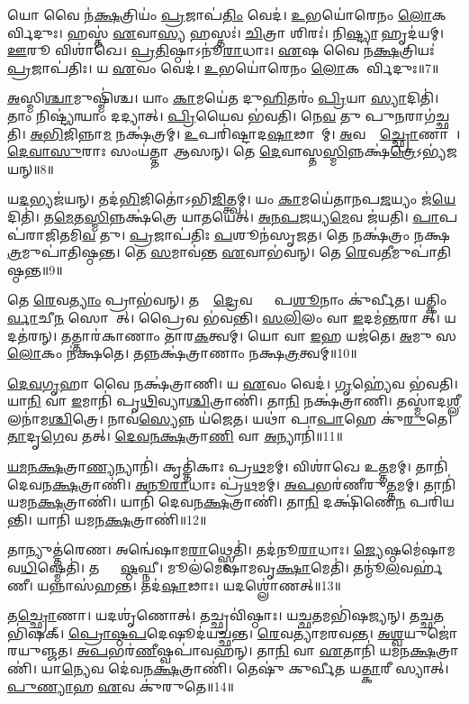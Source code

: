 𑌯𑍋 𑌵𑍈 𑌨॑\ul{𑌕𑍍𑌷}𑌤𑍍𑌰𑌿𑌯𑌂॑ \ul{𑌪𑍍𑌰}𑌜𑌾𑌪॑\ul{𑌤𑌿𑌂} 𑌵𑍇𑌦॑।
\ul{𑌉}𑌭𑌯𑍋॑𑌰𑍇𑌨𑌂 \ul{𑌲𑍋}𑌕𑌯𑍋᳚𑌰𑍍𑌵𑌿𑌦𑍁𑌃।
𑌹𑌸𑍍𑌤॑ \ul{𑌏}𑌵𑌾\ul{𑌸𑍍𑌯} 𑌹𑌸𑍍𑌤𑌃॑।
\ul{𑌚𑌿}𑌤𑍍𑌰𑌾 𑌶𑌿𑌰𑌃॑।
𑌨𑌿\ul{𑌷𑍍𑌟𑍍𑌯𑌾} 𑌹𑍃𑌦॑𑌯𑌮𑍍।
\ul{𑌊}𑌰𑍂 𑌵𑌿𑌶𑌾॑𑌖𑍇।
\ul{𑌪𑍍𑌰}\ul{𑌤𑌿}𑌷𑍍𑌠𑌾\-𑌽𑌨𑍂॑\ul{𑌰𑌾}𑌧𑌾𑌃।
\ul{𑌏}𑌷 𑌵𑍈 𑌨॑\ul{𑌕𑍍𑌷}𑌤𑍍𑌰𑌿𑌯𑌃॑ \ul{𑌪𑍍𑌰}𑌜𑌾𑌪॑𑌤𑌿𑌃।
𑌯 \ul{𑌏}𑌵𑌂 𑌵𑍇𑌦॑।
\ul{𑌉}𑌭𑌯𑍋॑𑌰𑍇𑌨𑌂 \ul{𑌲𑍋}𑌕𑌯𑍋᳚𑌰𑍍𑌵𑌿𑌦𑍁𑌃॥7॥

\ul{𑌅}𑌸𑍍𑌮𑌿\ul{𑌶𑍍𑌚𑌾}𑌮𑍁𑌷𑍍𑌮𑌿॑𑌶𑍍𑌚।
𑌯𑌾𑌂 \ul{𑌕𑌾}𑌮𑌯𑍇॑𑌤 𑌦𑍁\ul{𑌹𑌿}𑌤𑌰𑌂॑ \ul{𑌪𑍍𑌰𑌿}𑌯𑌾 \ul{𑌸𑍍𑌯𑌾}𑌦𑌿𑌤𑌿॑।
𑌤𑌾𑌂 𑌨𑌿𑌷𑍍𑌟𑍍𑌯𑌾॑𑌯𑌾𑌂 𑌦𑌦𑍍𑌯𑌾𑌤𑍍।
\ul{𑌪𑍍𑌰𑌿}𑌯𑍈𑌵 𑌭॑𑌵𑌤𑌿।
𑌨𑍇\ul{𑌵} 𑌤𑍁 𑌪𑍁\ul{𑌨}𑌰𑌾𑌗॑𑌚𑍍𑌛𑌤𑌿।
\ul{𑌅}\ul{𑌭𑌿}𑌜𑌿𑌨𑍍𑌨𑌾\ul{𑌮} 𑌨𑌕𑍍𑌷॑𑌤𑍍𑌰𑌮𑍍।
\ul{𑌉}𑌪𑌰𑌿॑𑌷𑍍𑌟𑌾𑌦\ul{𑌷𑌾}𑌢𑌾𑌨𑌾᳚𑌮𑍍।
\ul{𑌅}𑌵𑌸𑍍𑌤𑌾᳚\ul{𑌚𑍍𑌛𑍍𑌰𑍋}𑌣𑌾𑌯𑍈᳚।
\ul{𑌦𑍇}\ul{𑌵𑌾}\ul{𑌸𑍁}𑌰𑌾𑌃 𑌸𑌂𑌯॑𑌤𑍍𑌤𑌾 𑌆𑌸𑌨𑍍।
𑌤𑍇 \ul{𑌦𑍇}𑌵𑌾𑌸𑍍𑌤\ul{𑌸𑍍𑌮𑌿}𑌨𑍍𑌨𑌕𑍍𑌷॑\ul{𑌤𑍍𑌰𑍇}\-𑌽𑌭𑍍𑌯॑𑌜𑌯𑌨𑍍॥8॥

𑌯\ul{𑌦}𑌭𑍍𑌯𑌜॑𑌯𑌨𑍍।
𑌤𑌦॑\ul{𑌭𑌿}𑌜𑌿𑌤𑍋॑\-𑌽𑌭𑌿\ul{𑌜𑌿}𑌤𑍍𑌤𑍍𑌵𑌮𑍍।
𑌯𑌂 \ul{𑌕𑌾}𑌮𑌯𑍇॑𑌤𑌾𑌨𑌪\-\ul{𑌜}𑌯𑍍𑌯𑌂 𑌜॑\ul{𑌯𑍇}𑌦𑌿𑌤𑌿॑।
𑌤\ul{𑌮𑍇}𑌤\ul{𑌸𑍍𑌮𑌿}𑌨𑍍𑌨𑌕𑍍𑌷॑𑌤𑍍𑌰𑍇 𑌯𑌾𑌤𑌯𑍇𑌤𑍍।
\ul{𑌅}\ul{𑌨}\ul{𑌪}\ul{𑌜}𑌯𑍍𑌯\ul{𑌮𑍇}𑌵 𑌜॑𑌯𑌤𑌿।
\ul{𑌪𑌾}𑌪𑌪॑𑌰𑌾𑌜𑌿𑌤𑌮𑌿\ul{𑌵} 𑌤𑍁।
\ul{𑌪𑍍𑌰}𑌜𑌾𑌪॑𑌤𑌿𑌃 \ul{𑌪}𑌶𑍂𑌨॑𑌸𑍃𑌜𑌤।
𑌤𑍇 𑌨𑌕𑍍𑌷॑𑌤𑍍𑌰𑌂 𑌨𑌕𑍍𑌷\ul{𑌤𑍍𑌰}𑌮𑍁𑌪𑌾॑𑌤𑌿𑌷𑍍𑌠𑌨𑍍𑌤।
𑌤𑍇 \ul{𑌸}𑌮𑌾𑌵॑𑌨𑍍𑌤 \ul{𑌏}𑌵𑌾𑌭॑𑌵𑌨𑍍।
𑌤𑍇 \ul{𑌰𑍇}𑌵\ul{𑌤𑍀}𑌮𑍁𑌪𑌾॑𑌤𑌿𑌷𑍍𑌠𑌨𑍍𑌤॥9॥

𑌤𑍇 \ul{𑌰𑍇}𑌵\ul{𑌤𑍍𑌯𑌾𑌂} 𑌪𑍍𑌰𑌾𑌭॑𑌵𑌨𑍍।
𑌤𑌸𑍍𑌮𑌾᳚\ul{𑌦𑍍𑌰𑍇}𑌵𑌤𑍍𑌯𑌾𑌂᳚ 𑌪\ul{𑌶𑍂}𑌨𑌾𑌂 𑌕𑍁॑𑌰𑍍𑌵𑍀𑌤।
𑌯𑌤𑍍𑌕𑌿𑌂 𑌚𑌾᳚\ul{𑌰𑍍𑌵𑌾}𑌚𑍀\ul{𑌨}\ul{} 𑌸𑍋𑌮𑌾᳚𑌤𑍍।
𑌪𑍍𑌰𑍈𑌵 𑌭॑𑌵𑌨𑍍𑌤𑌿।
\ul{𑌸}\ul{𑌲𑌿}𑌲𑌂 𑌵𑌾 \ul{𑌇}𑌦𑌮॑\ul{𑌨𑍍𑌤}𑌰𑌾𑌸𑍀᳚𑌤𑍍।
𑌯𑌦𑌤॑𑌰𑌨𑍍।
𑌤𑌤𑍍𑌤𑌾𑌰॑𑌕𑌾𑌣𑌾𑌂 𑌤𑌾𑌰\ul{𑌕}𑌤𑍍𑌵𑌮𑍍।
𑌯𑍋 𑌵𑌾 \ul{𑌇}𑌹 𑌯𑌜॑𑌤𑍇।
\ul{𑌅}𑌮𑍁 𑌸 \ul{𑌲𑍋}𑌕𑌂 𑌨॑𑌕𑍍𑌷𑌤𑍇।
𑌤𑌨𑍍𑌨𑌕𑍍𑌷॑𑌤𑍍𑌰𑌾𑌣𑌾𑌂 𑌨𑌕𑍍𑌷\ul{𑌤𑍍𑌰}𑌤𑍍𑌵𑌮𑍍॥10॥

\ul{𑌦𑍇}\ul{𑌵}\ul{𑌗𑍃}𑌹𑌾 𑌵𑍈 𑌨𑌕𑍍𑌷॑𑌤𑍍𑌰𑌾𑌣𑌿।
𑌯 \ul{𑌏}𑌵𑌂 𑌵𑍇𑌦॑।
\ul{𑌗𑍃}𑌹𑍍𑌯𑍇॑𑌵 𑌭॑𑌵𑌤𑌿।
𑌯𑌾\ul{𑌨𑌿} 𑌵𑌾 \ul{𑌇}𑌮𑌾𑌨𑌿॑ 𑌪𑍃\ul{𑌥𑌿}𑌵𑍍𑌯𑌾\ul{𑌶𑍍𑌚𑌿}𑌤𑍍𑌰𑌾𑌣𑌿॑।
𑌤𑌾\ul{𑌨𑌿} 𑌨𑌕𑍍𑌷॑𑌤𑍍𑌰𑌾𑌣𑌿।
𑌤𑌸𑍍𑌮𑌾॑𑌦\ul{𑌶𑍍𑌲𑍀}𑌲𑌨𑌾॑𑌮\ul{𑌶𑍍𑌚𑌿}𑌤𑍍𑌰𑍇।
𑌨𑌾𑌵॑\ul{𑌸𑍍𑌯𑍇}𑌨𑍍𑌨 𑌯॑𑌜𑍇𑌤।
𑌯𑌥𑌾॑ 𑌪𑌾\ul{𑌪𑌾}𑌹𑍇 𑌕𑍁॑\ul{𑌰𑍁}𑌤𑍇।
\ul{𑌤𑌾}𑌦𑍃\ul{𑌗𑍇}𑌵 𑌤𑌤𑍍।
\ul{𑌦𑍇}\ul{𑌵}\ul{𑌨}\ul{𑌕𑍍𑌷}𑌤𑍍𑌰𑌾\ul{𑌣𑌿} 𑌵𑌾 \ul{𑌅}𑌨𑍍𑌯𑌾𑌨𑌿॑॥11॥

\ul{𑌯}\ul{𑌮}\ul{𑌨}\ul{𑌕𑍍𑌷}𑌤𑍍𑌰𑌾\ul{𑌣𑍍𑌯}𑌨𑍍𑌯𑌾𑌨𑌿॑।
𑌕𑍃𑌤𑍍𑌤𑌿॑𑌕𑌾𑌃 𑌪𑍍𑌰\ul{𑌥}𑌮𑌮𑍍।
𑌵𑌿𑌶𑌾॑𑌖𑍇 𑌉\ul{𑌤𑍍𑌤}𑌮𑌮𑍍।
𑌤𑌾𑌨𑌿॑ 𑌦𑍇𑌵𑌨\ul{𑌕𑍍𑌷}𑌤𑍍𑌰𑌾𑌣𑌿॑।
\ul{𑌅}\ul{𑌨𑍂}\ul{𑌰𑌾}𑌧𑌾𑌃 𑌪𑍍𑌰॑\ul{𑌥}𑌮𑌮𑍍।
\ul{𑌅}\ul{𑌪}𑌭𑌰॑𑌣𑍀𑌰𑍁\ul{𑌤𑍍𑌤}𑌮𑌮𑍍।
𑌤𑌾𑌨𑌿॑ 𑌯𑌮𑌨\ul{𑌕𑍍𑌷}𑌤𑍍𑌰𑌾𑌣𑌿॑।
𑌯𑌾𑌨𑌿॑ 𑌦𑍇𑌵𑌨\ul{𑌕𑍍𑌷}𑌤𑍍𑌰𑌾𑌣𑌿॑।
𑌤𑌾\ul{𑌨𑌿} 𑌦𑌕𑍍𑌷𑌿॑𑌣𑍇\ul{𑌨} 𑌪𑌰𑌿॑𑌯𑌨𑍍𑌤𑌿।
𑌯𑌾𑌨𑌿॑ 𑌯𑌮𑌨\ul{𑌕𑍍𑌷}𑌤𑍍𑌰𑌾𑌣𑌿॑॥12॥

𑌤𑌾𑌨𑍍𑌯𑍁𑌤𑍍𑌤॑𑌰𑍇𑌣।
𑌅𑌨𑍍𑌵𑍇॑𑌷𑌾𑌮\ul{𑌰𑌾}𑌥𑍍𑌸𑍍𑌮𑍇𑌤𑌿॑।
𑌤𑌦॑𑌨𑍂\ul{𑌰𑌾}𑌧𑌾𑌃।
\ul{𑌜𑍍𑌯𑍇}𑌷𑍍𑌠𑌮𑍇॑𑌷𑌾𑌮\-𑌵\ul{𑌧𑌿}𑌷𑍍𑌮𑍇𑌤𑌿॑।
𑌤𑌜𑍍𑌜𑍍𑌯𑍇᳚\ul{𑌷𑍍𑌠}𑌘𑍍𑌨𑍀।
𑌮𑍂𑌲॑𑌮𑍇𑌷𑌾𑌮𑌵𑍃\ul{𑌕𑍍𑌷𑌾}𑌮𑍇𑌤𑌿॑।
𑌤𑌨𑍍𑌮𑍂॑\ul{𑌲}𑌵𑌰𑍍\mbox{}𑌹॑𑌣𑍀।
𑌯𑌨𑍍𑌨𑌾𑌸॑𑌹𑌨𑍍𑌤।
𑌤𑌦॑\ul{𑌷𑌾}𑌢𑌾𑌃।
𑌯𑌦𑌶𑍍𑌲𑍋॑𑌣𑌤𑍍॥13॥

𑌤\ul{𑌚𑍍𑌛𑍍𑌰𑍋}𑌣𑌾।
𑌯𑌦𑌶𑍃॑𑌣𑍋𑌤𑍍।
𑌤𑌚𑍍𑌛𑍍𑌰𑌵𑌿॑𑌷𑍍𑌠𑌾𑌃।
𑌯\ul{𑌚𑍍𑌛}𑌤𑌮𑌭𑌿॑𑌷𑌜𑍍𑌯𑌨𑍍।
𑌤\ul{𑌚𑍍𑌛}𑌤𑌭𑌿॑𑌷𑌕𑍍।
\ul{𑌪𑍍𑌰𑍋}\ul{𑌷𑍍𑌠}\ul{𑌪}𑌦𑍇𑌷𑍂𑌦॑𑌯𑌚𑍍𑌛𑌨𑍍𑌤।
\ul{𑌰𑍇}𑌵𑌤𑍍𑌯𑌾॑𑌮𑌰𑌵𑌨𑍍𑌤।
\ul{𑌅}\ul{𑌶𑍍𑌵}𑌯𑍁𑌜𑍋॑𑌰𑌯𑍁𑌞𑍍𑌜𑌤।
\ul{𑌅}\ul{𑌪}𑌭𑌰॑\ul{𑌣𑍀}𑌷𑍍𑌵𑌪𑌾॑𑌵𑌹𑌨𑍍।
𑌤𑌾\ul{𑌨𑌿} 𑌵𑌾 \ul{𑌏}𑌤𑌾𑌨𑌿॑ 𑌯𑌮𑌨\ul{𑌕𑍍𑌷}𑌤𑍍𑌰𑌾𑌣𑌿॑।
𑌯𑌾\ul{𑌨𑍍𑌯𑍇}𑌵 𑌦𑍇॑𑌵𑌨\ul{𑌕𑍍𑌷}𑌤𑍍𑌰𑌾𑌣𑌿॑।
𑌤𑍇𑌷𑍁॑ 𑌕𑍁𑌰𑍍𑌵𑍀𑌤 𑌯\ul{𑌤𑍍𑌕𑌾}𑌰𑍀 𑌸𑍍𑌯𑌾𑌤𑍍।
\ul{𑌪𑍁}\ul{𑌣𑍍𑌯𑌾}𑌹 \ul{𑌏}𑌵 𑌕𑍁॑𑌰𑍁𑌤𑍇॥14॥

